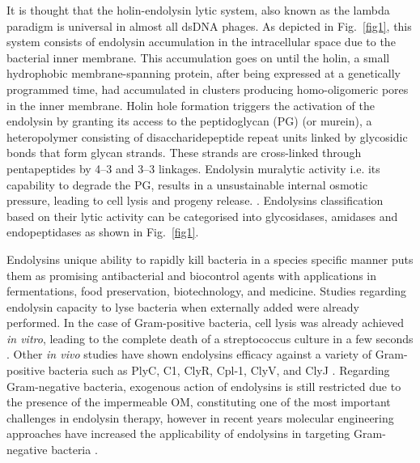 \documentclass[runningheads]{llncs}
\begin{document}
It is thought that the holin-endolysin lytic system, also known as the lambda paradigm is universal in almost all dsDNA phages. As depicted in Fig.~\ref{fig1}, this system consists of endolysin accumulation in the intracellular space due to the bacterial inner membrane. This accumulation goes on until the holin, a small hydrophobic membrane-spanning protein, after being expressed at a genetically programmed time, had accumulated in clusters producing homo-oligomeric pores in the inner membrane. Holin hole formation triggers the activation of the endolysin by granting its access to the peptidoglycan (PG) (or murein), a heteropolymer consisting of disaccharidepeptide repeat units linked by glycosidic bonds that form glycan strands. These strands are cross-linked through pentapeptides by 4–3 and 3–3 linkages. Endolysin muralytic activity i.e. its capability to degrade the PG, results in a unsustainable internal osmotic pressure, leading to cell lysis and progeny release. \cite{Cahill2019} \cite{Oliveira2013}. Endolysins classification based on their lytic activity can be categorised into glycosidases, amidases and endopeptidases \cite{Abdelrahman2021} \cite{Oliveira2013} as shown in Fig.~\ref{fig1}.

Endolysins unique ability to rapidly kill bacteria in a species specific manner puts them as promising antibacterial and biocontrol agents with applications in fermentations, food preservation, biotechnology, and medicine.
Studies regarding endolysin capacity to lyse bacteria when externally added were already performed. In the case of Gram-positive bacteria, cell lysis was already achieved \textit{in vitro}, leading to the complete death of a streptococcus culture in a few seconds \cite{Oliveira2013}. Other \textit{in vivo} studies have shown endolysins efficacy against a variety of Gram-positive bacteria such as PlyC, C1, ClyR, Cpl-1, ClyV, and ClyJ \cite{Abdelrahman2021}.
Regarding Gram-negative bacteria, exogenous action of endolysins is still restricted due to the presence of the impermeable OM, constituting one of the most important challenges in endolysin therapy, however in recent years molecular engineering
approaches have increased the applicability of endolysins in targeting Gram-negative bacteria \cite{Abdelrahman2021} \cite{Oliveira2013}.
\end{document}

